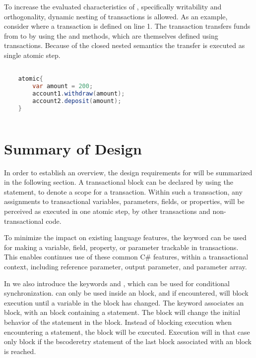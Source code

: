 To increase the evaluated characteristics\cite[p. 15-21]{dpt907e14trending} of \stmname, specifically writability and orthogonality, dynamic nesting of transactions is allowed. As an example, consider  where a transaction is defined on line 1. The transaction transfers funds from  to  by using the  and  methods, which are themselves defined using transactions. Because of the closed nested semantics the transfer is executed as single atomic step.


\begin{lstlisting}[label=lst:stm_nested_transactions_real,
  caption={Dynamically nested transactions},
  language=Java,  
  showspaces=false,
  showtabs=false,
  breaklines=true,
  showstringspaces=false,
  breakatwhitespace=true,
  commentstyle=\color{greencomments},
  keywordstyle=\color{bluekeywords},
  stringstyle=\color{redstrings},
  morekeywords={atomic, retry, orElse, var}]  % Start your code-block

	atomic{
		var amount = 200;
		account1.withdraw(amount);
		account2.deposit(amount);
	}
       
\end{lstlisting}

\section{Summary of Design}\label{sec:summary_design}
In order to establish an overview, the design requirements for \stmnamesp will be summarized in the following section. A transactional block can be declared by using the  statement, to denote a scope for a transaction. Within such a transaction, any assignments to transactional variables, parameters, fields, or properties, will be perceived as executed in one atomic step, by other transactions and non-transactional code. 

To minimize the impact on existing language features, the  keyword can be used for making a variable, field, property, or parameter trackable in transactions. This enables continues use of these common C\# features, within a transactional context, including reference parameter, output parameter, and parameter array.

In \stmnamesp we also introduce the keywords  and , which can be used for conditional synchronization.  can only be used inside an  block, and if encountered, will block execution until a variable in the  block has changed. The  keyword associates an  block, with an  block containing a  statement. The  block will change the initial behavior of the  statement in the  block. Instead of blocking execution when encountering a  statement, the  block will be executed. Execution will in that case only block if the bscode{retry} statement of the last  block associated with an  block is reached.

